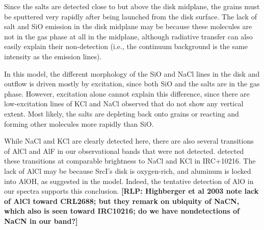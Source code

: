 \documentclass[twocolumn]{aastex62}
\newcommand{\sourcei}{SrcI\xspace}
\newcommand{\bam}[1]{\textcolor{green!65!black}{\textbf{[BAM: #1]}}}
\newcommand{\rlp}[1]{\textcolor{blue!65!black}{\textbf{[RLP: #1]}}}
\begin{document}
Since the salts are detected close to but above the disk midplane, the
grains must be sputtered very rapidly after being launched from the disk surface.
The lack of salt and SiO emission in the disk midplane may be because these
molecules are not in the gas phase at all in the midplane, although radiative
transfer can also easily explain their non-detection (i.e., the continuum
background is the same intensity as the emission lines).


In this model, the different morphology of the SiO and NaCl lines in the disk
and outflow is driven mostly by excitation, since both SiO and the salts are
in the gas phase.  However, excitation alone cannot explain this difference,
since there are low-excitation lines of KCl and NaCl observed that do not
show any vertical extent.  Most likely, the salts are depleting back onto
grains or reacting and forming other molecules more rapidly than SiO.

While NaCl and KCl are clearly detected here, there are also several transitions of
AlCl and AlF in our observational bands that were not detected.
\citet{Cernicharo1987a} detected these transitions at comparable brightness to NaCl
and KCl in IRC+10216.  The lack of AlCl may be because \sourcei's disk is
oxygen-rich, and aluminum is locked into AlOH, as suggested in the
\citet{Cherchneff2012a} model.  Indeed, the tentative detection of AlO
in our spectra supports this conclusion.
\rlp{Highberger et al 2003 note lack of AlCl toward CRL2688; but they remark
on ubiquity of NaCN, which also is seen toward IRC10216; do we have nondetections
of NaCN in our band?}
\end{document}
